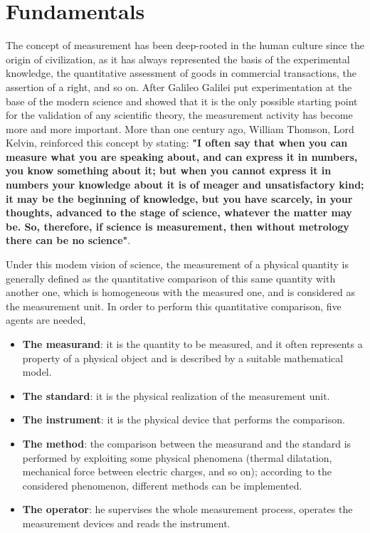 \documentclass[12pt, right open]{memoir}
\begin{document}
\section{Fundamentals}
The concept of measurement has been deep-rooted in the human culture since the origin of
civilization, as it has always represented the basis of the experimental knowledge, the
quantitative assessment of goods in commercial transactions, the assertion of a right, and so
on.
After Galileo Galilei put experimentation at the base of the modern science and showed
that it is the only possible starting point for the validation of any scientific theory, the
measurement activity has become more and more important. More than one century ago,
William Thomson, Lord Kelvin, reinforced this concept by stating: \textbf{"I often say that when
you can measure what you are speaking about, and can express it in numbers, you know
something about it; but when you cannot express it in numbers your knowledge about it is
of meager and unsatisfactory kind; it may be the beginning of knowledge, but you have
scarcely, in your thoughts, advanced to the stage of science, whatever the matter may be.
So, therefore, if science is measurement, then without metrology there can be no science"}.


Under this modem vision of science, the measurement of a physical quantity is
generally defined as the quantitative comparison of this same quantity with another one,
which is homogeneous with the measured one, and is considered as the measurement unit.
In order to perform this quantitative comparison, five agents are needed,

\begin{itemize}
\item \textbf{The measurand}: it is the quantity to be measured, and it often represents a property of a
physical object and is described by a suitable mathematical model.
\item \textbf{The standard}: it is the physical realization of the measurement unit.
\item \textbf{The instrument}: it is the physical device that performs the comparison.
\item \textbf{The method}: the comparison between the measurand and the standard is performed by
exploiting some physical phenomena (thermal dilatation, mechanical force between
electric charges, and so on); according to the considered phenomenon, different methods
can be implemented.
\item \textbf{The operator}: he supervises the whole measurement process, operates the measurement
devices and reads the instrument.
\end{itemize}
\end{document}
